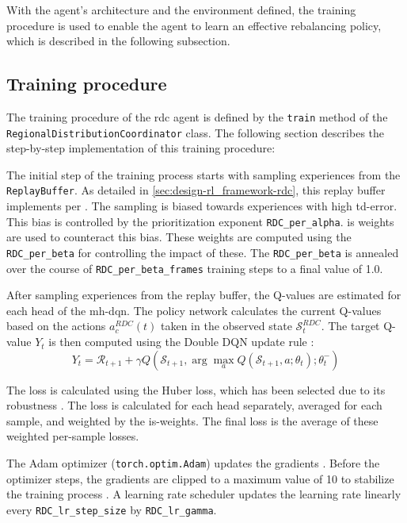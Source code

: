 With the agent's architecture and the environment defined, the training procedure is used to enable the agent to learn an effective rebalancing policy, which is described in the following subsection.

\subsection{Training procedure}
The training procedure of the \gls{rdc} agent is defined by the \texttt{train} method of the \texttt{RegionalDistributionCoordinator} class.
The following section describes the step-by-step implementation of this training procedure:

The initial step of the training process starts with sampling experiences from the \texttt{ReplayBuffer}.
As detailed in \autoref{sec:design-rl_framework-rdc}, this replay buffer implements \gls{per} \cite{schaul_prioritized_2016}.
The sampling is biased towards experiences with high \gls{td-error}.
This bias is controlled by the prioritization exponent \texttt{RDC\_per\_alpha}.
\gls{is} weights are used to counteract this bias.
These weights are computed using the \texttt{RDC\_per\_beta} for controlling the impact of these.
The \texttt{RDC\_per\_beta} is annealed over the course of \texttt{RDC\_per\_beta\_frames} training steps to a final value of 1.0.

After sampling experiences from the replay buffer, the Q-values are estimated for each head of the \gls{mh-dqn}.
The policy network calculates the current Q-values based on the actions $a_c^{RDC}(t)$ taken in the observed state $\mathcal{S}_t^{RDC}$.
The target Q-value $Y_t$ is then computed using the Double DQN update rule \cite{hasselt_deep_2016}:
\begin{equation}\label{eq:ddqn-target}
    Y_t = \mathcal{R}_{t+1} + \gamma Q(\mathcal{S}_{t+1},\arg\max_{a} Q(\mathcal{S}_{t+1},a;\theta_t);\theta_t^-)
\end{equation}

The loss is calculated using the Huber loss, which has been selected due to its robustness \cite{huber_robust_1964}.
The loss is calculated for each head separately, averaged for each sample, and weighted by the \gls{is}-weights.
The final loss is the average of these weighted per-sample losses.

The Adam optimizer (\texttt{torch.optim.Adam}) updates the gradients \cite{kingma_adam_2017}.
Before the optimizer steps, the gradients are clipped to a maximum value of 10 to stabilize the training process \cite{mnih_human-level_2015}.
A learning rate scheduler updates the learning rate linearly every \texttt{RDC\_lr\_step\_size} by \texttt{RDC\_lr\_gamma}.

